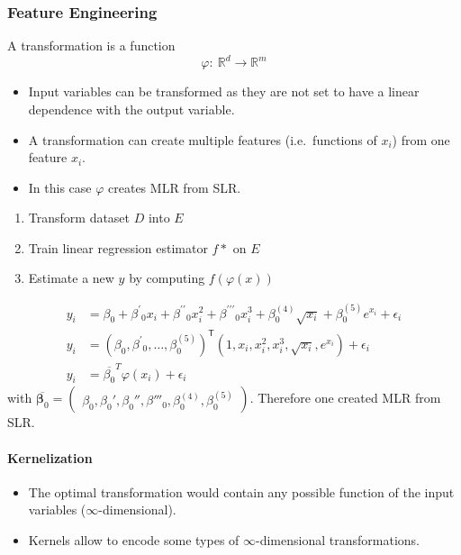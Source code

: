 \subsubsection{Feature Engineering}

A transformation is a function
\begin{equation*}
    \varphi{:}\:\mathbb{R}^d\to\mathbb{R}^m
\end{equation*}

\begin{itemize}
    \item Input variables can be transformed as they are not set to have a linear dependence with the output variable.
    \item A transformation can create multiple features (i.e.\ functions of $x_i$) from one feature $x_i$.
    \item In this case $\varphi$ creates MLR from SLR.
\end{itemize}


\begin{enumerate}
    \item Transform dataset $D$ into $E$
    \item Train linear regression estimator $f*$ on $E$
    \item Estimate a new $y$ by computing $f(\varphi(x))$
\end{enumerate}



\begin{align*}
    y_i & =\beta_0+\beta^{\prime}{}_0x_i+\beta^{\prime\prime}{}_0x_i^2+\beta^{\prime\prime\prime}{}_0x_i^3+\beta_0^{(4)}\sqrt{x_i}+\beta_0^{(5)}e^{x_i}+\epsilon_i \\
    y_i & ={\left(\beta_0,\beta^{\prime}{}_0,\dots,\beta_0^{(5)}\right)}^{\mathsf{T}}\left(1,x_i,x_i^2,x_i^3,\sqrt{x_i},e^{x_i}\right)+\epsilon_i                  \\
    y_i & =\overline{\beta_0}^T\varphi(x_i)+\epsilon_i
\end{align*}
with $\overline{\boldsymbol{\beta}_0}=\begin{pmatrix}\beta_0,\beta_0',\beta_0'',\beta'''_0,\beta_0^{(4)},\beta_0^{(5)}\end{pmatrix}$. Therefore one created MLR from SLR. %

\paragraph{Kernelization}
\begin{itemize}
    \item The optimal transformation would contain any possible function of the input variables ($\infty$-dimensional).
    \item Kernels allow to encode some types of $\infty$-dimensional transformations.
\end{itemize}

